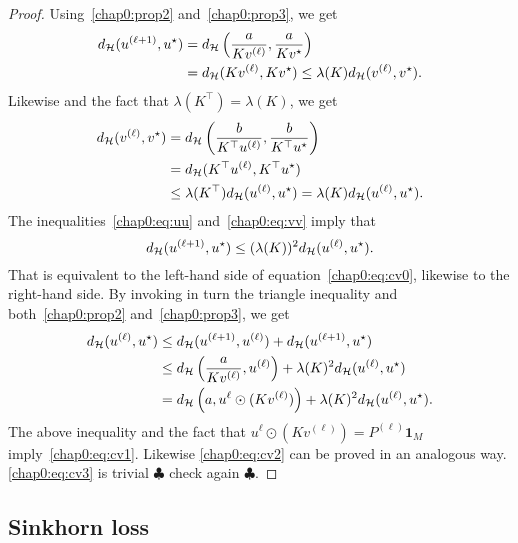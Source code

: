 \begin{proof}
Using~\eqref{chap0:prop2} and~\eqref{chap0:prop3}, we get 
\begin{align}
\notag
d_{\mathcal{H}}(u^{(\ell +1)}, u^{\star})&= d_{\mathcal{H}} \left( \frac{a}{Kv^{(\ell)}}, \frac{a}{Kv^{\star}} \right) \\
\label{chap0:eq:uu}
&= d_{\mathcal{H}}(Kv^{(\ell)}, Kv^{\star}) \leq \lambda(K) d_{\mathcal{H}}(v^{(\ell)}, v^{\star}).
\end{align}
Likewise and the fact that $\lambda(K^{\top}) = \lambda(K)$, we get
\begin{align}
\notag
d_{\mathcal{H}}(v^{(\ell)}, v^{\star})&= d_{\mathcal{H}} \left( \frac{b}{K^{\top}u^{(\ell)}}, \frac{b}{K^{\top}u^{\star}} \right) \\
\notag
&= d_{\mathcal{H}}(K^{\top}u^{(\ell)}, K^{\top}u^{\star})\\
\label{chap0:eq:vv}
& \leq \lambda(K^{\top}) d_{\mathcal{H}}(u^{(\ell)}, u^{\star}) = \lambda(K) d_{\mathcal{H}}(u^{(\ell)}, u^{\star}).
\end{align}
The inequalities~\eqref{chap0:eq:uu} and~\eqref{chap0:eq:vv} imply that 
\begin{equation*}
d_{\mathcal{H}}(u^{(\ell +1)}, u^{\star}) \leq (\lambda(K))^2 d_{\mathcal{H}}(u^{(\ell)}, u^{\star}).
\end{equation*}
That is equivalent to the left-hand side of equation~\eqref{chap0:eq:cv0}, likewise to the right-hand side. By invoking in turn the triangle inequality and both~\eqref{chap0:prop2} and~\eqref{chap0:prop3}, we get
\begin{align*}
d_{\mathcal{H}}(u^{(\ell)}, u^{\star})& \leq d_{\mathcal{H}}(u^{(\ell +1)}, u^{(\ell)}) +  d_{\mathcal{H}}(u^{(\ell+1)}, u^{\star})\\
& \leq d_{\mathcal{H}} \left( \frac{a}{Kv^{(\ell)}}, u^{(\ell)} \right) + \lambda(K)^2 d_{\mathcal{H}}(u^{(\ell)}, u^{\star})\\
&= d_{\mathcal{H}} \left( a, u^{\ell} \odot (Kv^{(\ell)}) \right) + \lambda(K)^2 d_{\mathcal{H}}(u^{(\ell)}, u^{\star}).
\end{align*}
The above inequality and the fact that $u^{\ell} \odot (Kv^{(\ell)}) = P^{(\ell)} \mathbf{1}_M$  imply~\eqref{chap0:eq:cv1}. Likewise \eqref{chap0:eq:cv2} can be proved in an analogous way. \eqref{chap0:eq:cv3} is trivial $\clubsuit$ check again $\clubsuit$.
\end{proof}
\subsection{Sinkhorn loss}
\label{subsec:sinkhorn}

